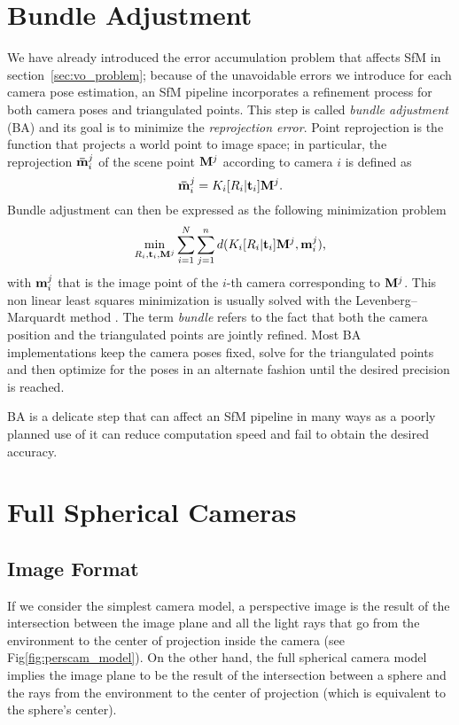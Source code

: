 \section{Bundle Adjustment}
We have already introduced the error accumulation problem that affects SfM in 
section~\ref{sec:vo_problem}; because of the unavoidable errors we introduce 
for each camera pose estimation, an SfM pipeline incorporates a 
refinement process for both camera poses and triangulated points.
This step is called \textit{bundle adjustment} (BA) and its goal is to 
minimize the \textit{reprojection error}.
Point reprojection is the function that projects a world point to image space; 
in particular, the reprojection ${\mathbf{\bar{m}}_i}^j$ of the scene point 
$\mathbf{M}^j$ according to camera $i$ is defined as
\begin{equation*}
	{\mathbf{\bar{m}}_i}^j = K_i[R_i | \mathbf{t}_i]\mathbf{M}^j	\text{.}
\end{equation*}
\noindent Bundle adjustment can then be expressed as the following minimization 
problem
\begin{equation*}
	\min_{R_i, \mathbf{t}_i, \mathbf{M}^j} 
	\sum_{i = 1}^N\sum_{j = 1}^n 
	d(K_i[R_i | \mathbf{t}_i]\mathbf{M}^j, \mathbf{m}_i^j) \text{,}
\end{equation*}
\noindent with $\mathbf{m}_i^j$ that is the image point of the $i$-th camera
corresponding to $\mathbf{M}^j$.
This non linear least squares minimization is usually solved with the 
Levenberg–Marquardt method 
\cite{triggs1999bundle,Hartley2004,levenberg1944method}.
The term \textit{bundle} refers to the fact that both the camera position and
the triangulated points are jointly refined. Most BA implementations keep the 
camera poses fixed, solve for the triangulated points and then optimize for the
poses in an alternate fashion until the desired precision is reached.

BA is a delicate step that can affect an SfM pipeline in many ways
\cite{lourakis2009sba,triggs1999bundle,Hartley2004} as a poorly planned use of 
it can reduce computation speed and fail to obtain the desired accuracy.

\section{Full Spherical Cameras}
\subsection{Image Format}
If we consider the simplest camera model, 
a perspective image is the result of the intersection between the image plane 
and all the light rays that go from the environment to the center of 
projection inside the camera (see Fig\ref{fig:perscam_model}).
\label{fig:perscam_model}
On the other hand, the full spherical camera model implies the image plane 
to be the result of the intersection between a sphere and the rays from the 
environment to the center of projection (which is equivalent to the sphere's 
center).

